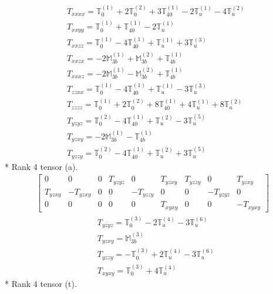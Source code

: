 \documentclass[fleqn,8pt,landscape]{jsarticle}
\begin{document}
\begin{align*}
& T_{xxxx} = \mathbb{T}_{0}^{(1)} + 2 \mathbb{T}_{0}^{(2)} + 3 \mathbb{T}_{40}^{(1)} - 2 \mathbb{T}_{u}^{(1)} - 4 \mathbb{T}_{u}^{(2)} \\
& T_{xxyy} = \mathbb{T}_{0}^{(1)} + \mathbb{T}_{40}^{(1)} - 2 \mathbb{T}_{u}^{(1)} \\
& T_{xxzz} = \mathbb{T}_{0}^{(1)} - 4 \mathbb{T}_{40}^{(1)} + \mathbb{T}_{u}^{(1)} + 3 \mathbb{T}_{u}^{(3)} \\
& T_{xxzx} = - 2 \mathbb{M}_{3b}^{(1)} + \mathbb{M}_{3b}^{(2)} + \mathbb{T}_{4b}^{(1)} \\
& T_{xxxz} = - 2 \mathbb{M}_{3b}^{(1)} - \mathbb{M}_{3b}^{(2)} + \mathbb{T}_{4b}^{(1)} \\
& T_{zzxx} = \mathbb{T}_{0}^{(1)} - 4 \mathbb{T}_{40}^{(1)} + \mathbb{T}_{u}^{(1)} - 3 \mathbb{T}_{u}^{(3)} \\
& T_{zzzz} = \mathbb{T}_{0}^{(1)} + 2 \mathbb{T}_{0}^{(2)} + 8 \mathbb{T}_{40}^{(1)} + 4 \mathbb{T}_{u}^{(1)} + 8 \mathbb{T}_{u}^{(2)} \\
& T_{yzyz} = \mathbb{T}_{0}^{(2)} - 4 \mathbb{T}_{40}^{(1)} + \mathbb{T}_{u}^{(2)} - 3 \mathbb{T}_{u}^{(5)} \\
& T_{yzxy} = - 2 \mathbb{M}_{3b}^{(1)} - \mathbb{T}_{4b}^{(1)} \\
& T_{yzzy} = \mathbb{T}_{0}^{(2)} - 4 \mathbb{T}_{40}^{(1)} + \mathbb{T}_{u}^{(2)} + 3 \mathbb{T}_{u}^{(5)}
\end{align*}
* Rank 4 tensor (a).
\begin{align*}
\begin{bmatrix} 0 & 0 & 0 & T_{yzyz} & 0 & T_{yzxy} & T_{yzzy} & 0 & T_{yzxy} \\ T_{yzxy} & - T_{yzxy} & 0 & 0 & - T_{yzzy} & 0 & 0 & - T_{yzyz} & 0 \\ 0 & 0 & 0 & 0 & 0 & T_{xyxy} & 0 & 0 & - T_{xyxy} \end{bmatrix}
\end{align*}
\begin{align*}
& T_{yzyz} = \mathbb{T}_{0}^{(3)} - 2 \mathbb{T}_{u}^{(4)} - 3 \mathbb{T}_{u}^{(6)} \\
& T_{yzxy} = \mathbb{M}_{3b}^{(3)} \\
& T_{yzzy} = - \mathbb{T}_{0}^{(3)} + 2 \mathbb{T}_{u}^{(4)} - 3 \mathbb{T}_{u}^{(6)} \\
& T_{xyxy} = \mathbb{T}_{0}^{(3)} + 4 \mathbb{T}_{u}^{(4)}
\end{align*}
* Rank 4 tensor (t).
\end{document}
